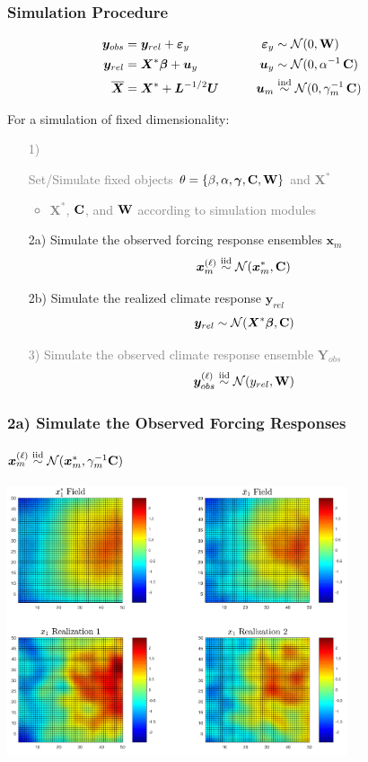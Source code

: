 \documentclass{beamer}
\newcommand{\C}{\ensuremath{\text{Cov}}}
\newcommand{\iid}{\ensuremath{\stackrel{\text{iid}}{\sim}}}
\newcommand{\light}[1]{\textcolor{gray}{#1}}
\def\*#1{\bm{#1}}
\def\C{\textbf{\text{C}}}
\def\W{\textbf{\text{W}}}
\begin{document}
\begin{frame}
\frametitle{Simulation Procedure}

\begin{block}{}
\vspace*{-\baselineskip}\setlength\belowdisplayshortskip{0pt}
\begin{alignat*}{3}
\*y_{obs} &= \*y_{rel} + \*\varepsilon_y  \qquad \quad &\*\varepsilon_y &\sim \mathcal N(0,\W)\\
\*y_{rel} &= \*X^* \*\beta + \*u_y \nonumber  \qquad  &\*u_y &\sim \mathcal N(0,\alpha^{-1}\,\C) \\
\overline{\*X} &= \*X^* + \*L^{-1/2} \*U \qquad    &\*u_m &\stackrel{\text{ind}}{\sim} \mathcal N(0,\gamma_m^{-1} \, \C)  \:
\end{alignat*}
\end{block}

For a simulation of fixed dimensionality:
\begin{itemize}
\item[\light{1)}] \light{Set/Simulate fixed objects $\theta = \{ \beta, \alpha, \*\gamma , \C, \W \}$ and $\*X^*$
\begin{itemize}
\item \light{$\*X^*$, $\C$, and $\W$ according to simulation modules}
\end{itemize}
}
\item[2a)] Simulate the observed forcing response ensembles $\*x_m$ 
\[
\*x^{(\ell)}_m \iid \mathcal N ( \*x_m^*, \C)
\]
\item[2b)] Simulate the realized climate response $\* y_{rel}$
\[
\*y_{rel} \sim \mathcal N ( \*X^* \* \beta, \C)
\]
\item[\light{3)}] \light{Simulate the observed climate response ensemble $\*Y_{obs}$}
\light{\[
\*y_{obs}^{(\ell)} \iid \mathcal N ( y_{rel}, \W)
\]}
\end{itemize}
\end{frame}



\begin{frame}
\frametitle{2a) Simulate the Observed Forcing Responses}
\framesubtitle{$\*x^{(\ell)}_m \iid \mathcal N ( \*x_m^*, \gamma_m^{-1} \C)$}
\begin{center}
\includegraphics[width=0.75\textwidth]{Images/xGeneration.png}
\end{center}
\end{frame}
\end{document}
